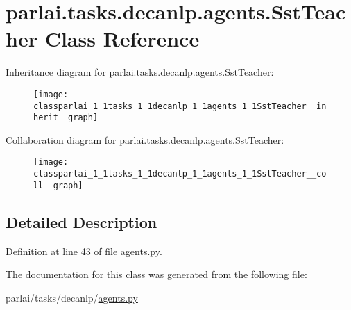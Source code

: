 \hypertarget{classparlai_1_1tasks_1_1decanlp_1_1agents_1_1SstTeacher}{}\section{parlai.\+tasks.\+decanlp.\+agents.\+Sst\+Teacher Class Reference}
\label{classparlai_1_1tasks_1_1decanlp_1_1agents_1_1SstTeacher}


Inheritance diagram for parlai.\+tasks.\+decanlp.\+agents.\+Sst\+Teacher\+:
\nopagebreak
\begin{figure}[H]
\begin{center}
\leavevmode
\texttt{[image: classparlai\_1\_1tasks\_1\_1decanlp\_1\_1agents\_1\_1SstTeacher\_\_inherit\_\_graph]}
\end{center}
\end{figure}


Collaboration diagram for parlai.\+tasks.\+decanlp.\+agents.\+Sst\+Teacher\+:
\nopagebreak
\begin{figure}[H]
\begin{center}
\leavevmode
\texttt{[image: classparlai\_1\_1tasks\_1\_1decanlp\_1\_1agents\_1\_1SstTeacher\_\_coll\_\_graph]}
\end{center}
\end{figure}


\subsection{Detailed Description}


Definition at line 43 of file agents.\+py.



The documentation for this class was generated from the following file\+:\begin{DoxyCompactItemize}
\item 
parlai/tasks/decanlp/\hyperlink{parlai_2tasks_2decanlp_2agents_8py}{agents.\+py}\end{DoxyCompactItemize}
